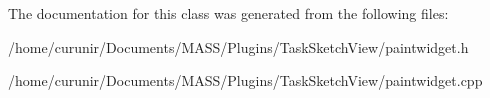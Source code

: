 The documentation for this class was generated from the following files\+:\begin{DoxyCompactItemize}
\item 
/home/curunir/\+Documents/\+M\+A\+S\+S/\+Plugins/\+Task\+Sketch\+View/paintwidget.\+h\item 
/home/curunir/\+Documents/\+M\+A\+S\+S/\+Plugins/\+Task\+Sketch\+View/paintwidget.\+cpp\end{DoxyCompactItemize}
